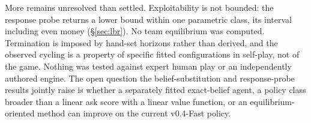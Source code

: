 \documentclass[11pt]{article}
\theoremstyle{definition}
\DeclareRobustCommand{\vfast}{\texorpdfstring{\mbox{v0.4-Fast}}{v0.4-Fast}}
\begin{document}
More remains unresolved than settled. Exploitability is not bounded: the
response probe returns a lower bound within one parametric class, its interval
including even money (\S\ref{sec:lbr}). No team equilibrium was computed.
Termination is imposed by hand-set horizons rather than derived, and the
observed cycling is a property of specific fitted configurations in self-play,
not of the game. Nothing was tested against expert human play or an
independently authored engine. The open question the belief-substitution and
response-probe results jointly raise is whether a separately fitted
exact-belief agent, a policy class broader than a linear ask score with a linear
value function, or an equilibrium-oriented method can improve on the current
\vfast{} policy.

\end{document}
